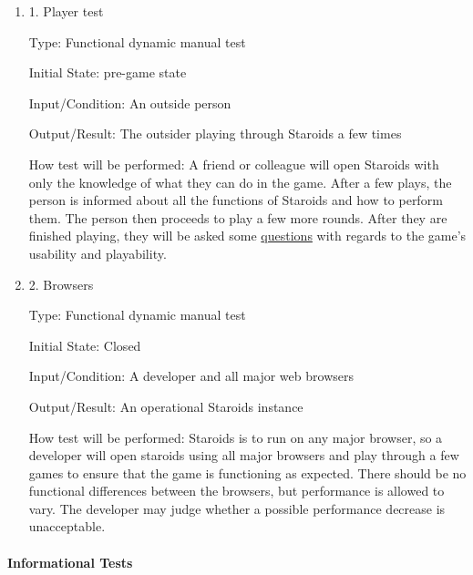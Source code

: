 \documentclass[12pt, titlepage]{article}
\begin{document}
\begin{enumerate}

\item{1. Player test\\}

Type: Functional dynamic manual test

Initial State: pre-game state

Input/Condition: An outside person

Output/Result: The outsider playing through Staroids a few times

How test will be performed: A friend or colleague will open Staroids with only the knowledge of what they can do in the game. After a few plays, the person is informed about all the functions of Staroids and how to perform them. The person then proceeds to play a few more rounds. After they are finished playing, they will be asked some \hyperref[interview:questions]{questions} with regards to the game's usability and playability.

\item{2. Browsers\\}

Type: Functional dynamic manual test

Initial State: Closed

Input/Condition: A developer and all major web browsers

Output/Result: An operational Staroids instance

How test will be performed: Staroids is to run on any major browser, so a developer will open staroids using all major browsers and play through a few games to ensure that the game is functioning as expected. There should be no functional differences between the browsers, but performance is allowed to vary. The developer may judge whether a possible performance decrease is unacceptable.

\end{enumerate}

\paragraph{Informational Tests}
\end{document}
